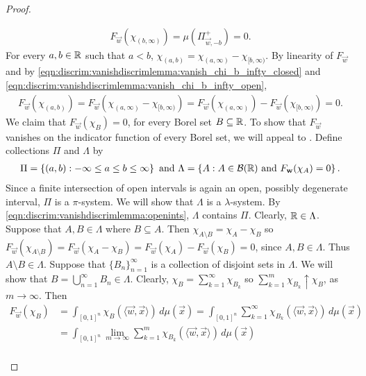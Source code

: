 \begin{proof}
\begin{step}
\begin{align}
    \label{eqn:discrim:vanishdiscrimlemma:vanish_chi_b_infty_open}
    F_{\vec{w}}(\chi_{(b, \infty)}) = \mu(\Pi_{\vec{w}, -b}^{+}) = 0.
\end{align}
For every $a, b \in {\mathbb R}$ such that $a < b$, $\chi_{(a,b)} = \chi_{(a, \infty)} - \chi_{[b, \infty)}$. By linearity of $F_\vec{w}$ and by \ref{eqn:discrim:vanishdiscrimlemma:vanish_chi_b_infty_closed} and  \ref{eqn:discrim:vanishdiscrimlemma:vanish_chi_b_infty_open},
\begin{align}
    \label{eqn:discrim:vanishdiscrimlemma:openints}
    F_{\vec{w}}(\chi_{(a,b)}) = F_{\vec{w}}(\chi_{(a, \infty)} - \chi_{[b, \infty)}) = F_{\vec{w}}(\chi_{(a, \infty)}) - F_{\vec{w}}(\chi_{[b, \infty)}) = 0.
\end{align} We claim that $F_{\vec{w}}(\chi_B) = 0$, for every Borel set $B \subseteq {\mathbb R}$.
To show that $F_\vec{w}$ vanishes on the indicator function of every Borel set, we will appeal to .
Define collections $\Pi$ and $\Lambda$ by 
\begin{align*}
    \Pi = \left \{ (a,b) : - \infty \leq a \leq b \leq \infty \right \} \text{ and } \Lambda = \left \{ A : A \in {\mathcal B}({\mathbb R}) \text{ and } F_{\mathbf{w}}(\chi_{A}) = 0 \right \}.
\end{align*}
Since a finite intersection of open intervals is again an open, possibly degenerate interval, $\Pi$ is a $\pi$-system. We will show that $\Lambda$ is a $\lambda$-system. By \ref{eqn:discrim:vanishdiscrimlemma:openints}, $\Lambda$ contains $\Pi$. Clearly, ${\mathbb R} \in \Lambda$. Suppose that $A, B \in \Lambda$ where $B \subseteq A$. Then $\chi_{A \setminus B} = \chi_A - \chi_B$ so $F_{\vec{w}}(\chi_{A \setminus B}) = F_{\vec{w}}(\chi_A - \chi_B)  =F_{\vec{w}}(\chi_A ) - F_{\vec{w}}(\chi_B) = 0$, since $A, B \in \Lambda$. Thus $A \setminus B \in \Lambda$. Suppose that $\{ B_n \}_{n =1}^\infty$ is a collection of disjoint sets in $\Lambda$. We will show that $B = \bigcup_{n=1}^\infty B_n \in \Lambda$. Clearly, $\chi_B = \sum_{k=1}^\infty \chi_{B_k}$ so $\sum_{k=1}^m \chi_{B_k} \uparrow \chi_B$, as $m \to \infty$. Then
\begin{align*}
    F_{\vec{w}}(\chi_{B}) &=  \int_{[0,1]^n} \chi_B ( \langle \vec{w}, \vec{x} \rangle  ) \, d \mu  (\vec{x}) =  \int_{[0,1]^n} \sum_{k=1}^\infty \chi_{B_k} ( \langle \vec{w}, \vec{x} \rangle  ) \, d \mu  (\vec{x}) \\
               &=   \int_{[0,1]^n} \lim_{m \to \infty} \sum_{k=1}^m \chi_{B_k} ( \langle \vec{w}, \vec{x} \rangle  ) \, d \mu  (\vec{x})  \\

\end{align*}
\end{step}
\end{proof}
